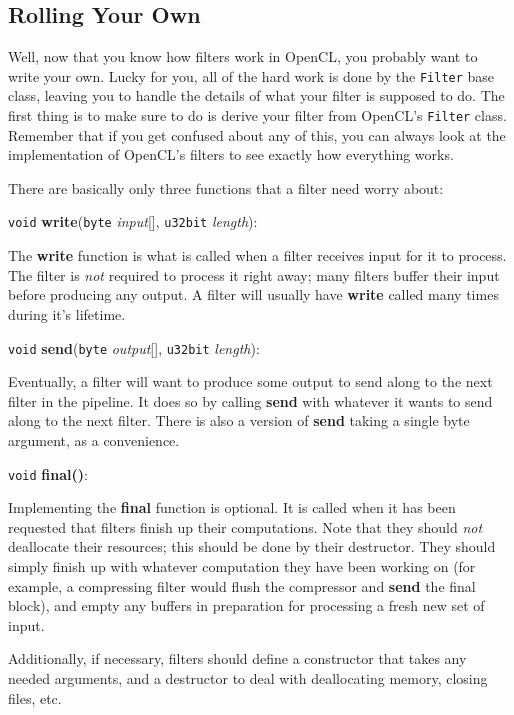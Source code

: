 \documentclass{article}
\newcommand{\function}[1]{\textbf{#1}}
\newcommand{\type}[1]{\texttt{#1}}
\renewcommand{\arg}[1]{\textsl{#1}}
\begin{document}
\subsection{Rolling Your Own}

Well, now that you know how filters work in OpenCL, you probably want to write
your own. Lucky for you, all of the hard work is done by the \type{Filter} base
class, leaving you to handle the details of what your filter is supposed to
do. The first thing is to make sure to do is derive your filter from OpenCL's
\type{Filter} class. Remember that if you get confused about any of this, you
can always look at the implementation of OpenCL's filters to see exactly how
everything works.

There are basically only three functions that a filter need worry about:

\vskip 10pt \noindent
\type{void} \function{write}(\type{byte} \arg{input}[], \type{u32bit}
\arg{length}):

\vskip 5pt
The \function{write} function is what is called when a filter receives input
for it to process. The filter is \emph{not} required to process it right away;
many filters buffer their input before producing any output. A filter will
usually have \function{write} called many times during it's lifetime.

\vskip 10pt \noindent
\type{void} \function{send}(\type{byte} \arg{output}[], \type{u32bit}
\arg{length}):

\vskip 5pt
Eventually, a filter will want to produce some output to send along to the next
filter in the pipeline. It does so by calling \function{send} with whatever it
wants to send along to the next filter. There is also a version of
\function{send} taking a single byte argument, as a convenience.

\vskip 10pt \noindent
\type{void} \function{final()}:

\vskip 5pt
Implementing the \function{final} function is optional. It is called when it
has been requested that filters finish up their computations. Note that they
should \emph{not} deallocate their resources; this should be done by their
destructor. They should simply finish up with whatever computation they have
been working on (for example, a compressing filter would flush the compressor
and \function{send} the final block), and empty any buffers in preparation for
processing a fresh new set of input.

\vskip 10pt
Additionally, if necessary, filters should define a constructor that takes any
needed arguments, and a destructor to deal with deallocating memory, closing
files, etc.
\end{document}
